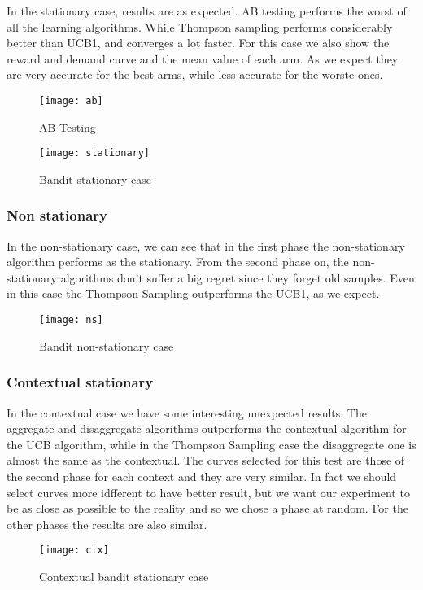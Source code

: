 In the stationary case, results are as expected. AB testing performs the worst of all the learning algorithms.
While Thompson sampling performs considerably better than UCB1, and converges a lot faster.
For this case we also show the reward and demand curve and the mean value of each arm. As we expect they are very accurate
for the best arms, while less accurate for the worste ones.

\begin{figure}[H]
	\texttt{[image: ab]}
	\caption{AB Testing}
\end{figure}

\begin{figure}[H]
	\texttt{[image: stationary]}
	\caption{Bandit stationary case}
\end{figure}

\newpage
\subsubsection{Non stationary}

In the non-stationary case, we can see that in the first phase the non-stationary algorithm performs as the stationary.
From the second phase on, the non-stationary algorithms don't suffer a big regret since they forget old samples.
Even in this case the Thompson Sampling outperforms the UCB1, as we expect.

\begin{figure}[H]
	\texttt{[image: ns]}
	\caption{Bandit non-stationary case}
\end{figure}

\newpage
\subsubsection{Contextual stationary}

In the contextual case we have some interesting unexpected results. The aggregate and disaggregate algorithms outperforms the contextual algorithm for
the UCB algorithm, while in the Thompson Sampling case the disaggregate one is almost the same as the contextual.
The curves selected for this test are those of the second phase for each context and they are very similar. In fact we should
select curves more idfferent to have better result, but we want our experiment to be as close as possible to the reality and so we
chose a phase at random. For the other phases the results are also similar.

\begin{figure}[H]
	\texttt{[image: ctx]}
	\caption{Contextual bandit stationary case}
\end{figure}

